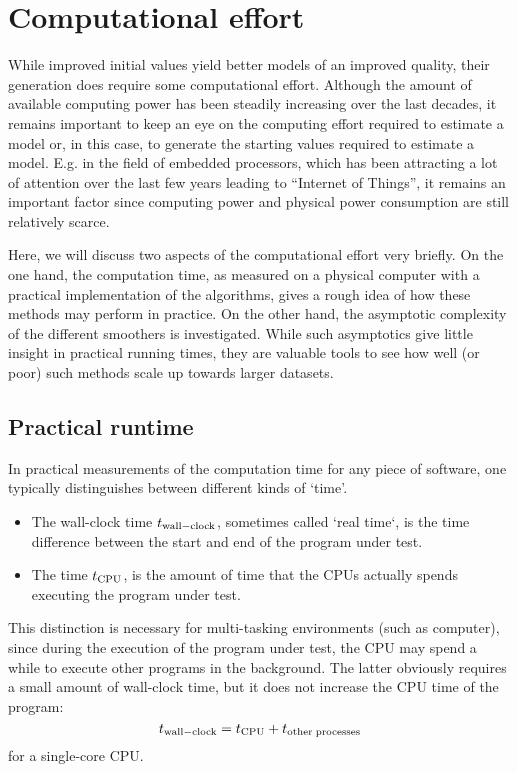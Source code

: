 \section{Computational effort}\label{sec:initvals:computation}
While improved initial values yield better models of an improved quality, their generation does require some computational effort.
Although the amount of available computing power has been steadily increasing over the last decades, it remains important to keep an eye on the computing effort required to estimate a model or, in this case, to generate the starting values required to estimate a model.
E.g. in the field of embedded processors, which has been attracting a lot of attention over the last few years leading to ``Internet of Things'', it remains an important factor since computing power and physical power consumption are still relatively scarce.

Here, we will discuss two aspects of the computational effort very briefly.
On the one hand, the computation time, as measured on a physical computer with a practical implementation of the algorithms, gives a rough idea of how these methods may perform in practice.
On the other hand, the asymptotic complexity of the different smoothers is investigated. 
While such asymptotics give little insight in practical running times, they are valuable tools to see how well (or poor) such methods scale up towards larger datasets.

\subsection{Practical runtime}
In practical measurements of the computation time for any piece of software, one typically distinguishes between different kinds of `time'.
\begin{itemize}
  \item The wall-clock time $t_{\mathrm{wall-clock}}$, sometimes called `real time`, is the time difference between the start and end of the program under test.
  \item The  time $t_{\mathrm{CPU}}$, is the amount of time that the \glspl{CPU} actually spends executing the program under test.
\end{itemize}
This distinction is necessary for multi-tasking environments (such as computer), since during the execution of the program under test, the \gls{CPU} may spend a while to execute other programs in the background.
The latter obviously requires a small amount of wall-clock time, but it does not increase the \gls{CPU} time of the program:
\begin{equation}
  t_{\mathrm{wall-clock}} = t_{\mathrm{CPU}} + t_{\mathrm{other\;processes}}
\end{equation}
for a single-core \gls{CPU}.

